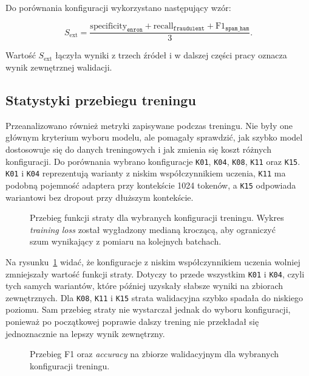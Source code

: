 Do porównania konfiguracji wykorzystano następujący wzór:

\[
S_{\mathrm{ext}} =
\frac{
\mathrm{specificity}_{\texttt{enron}} +
\mathrm{recall}_{\texttt{fraudulent}} +
\mathrm{F1}_{\texttt{spam\_ham}}
}{3}.
\]

Wartość \(S_{\mathrm{ext}}\) łączyła wyniki z trzech źródeł i w dalszej części
pracy oznacza wynik zewnętrznej walidacji.

\subsection{Statystyki przebiegu treningu}

Przeanalizowano również metryki zapisywane podczas treningu. Nie były one
głównym kryterium wyboru modelu, ale pomagały sprawdzić, jak szybko model
dostosowuje się do danych treningowych i jak zmienia się koszt różnych
konfiguracji. Do porównania wybrano
konfiguracje \texttt{K01}, \texttt{K04}, \texttt{K08}, \texttt{K11} oraz
\texttt{K15}. \texttt{K01} i \texttt{K04} reprezentują warianty z niskim
współczynnikiem uczenia,
\texttt{K11} ma podobną pojemność adaptera przy kontekście 1024 tokenów, a
\texttt{K15} odpowiada wariantowi bez dropout przy dłuższym kontekście.

\begin{figure}[htbp]
\centering

\caption{Przebieg funkcji straty dla wybranych konfiguracji treningu. Wykres
\emph{training loss} został wygładzony medianą kroczącą, aby ograniczyć szum
wynikający z pomiaru na kolejnych batchach.}
\label{fig:checkpoint-training-loss-diagnostics}
\end{figure}

Na rysunku~\ref{fig:checkpoint-training-loss-diagnostics} widać, że konfiguracje
z niskim współczynnikiem uczenia wolniej zmniejszały wartość funkcji straty.
Dotyczy to przede wszystkim \texttt{K01} i \texttt{K04}, czyli tych samych
wariantów, które później uzyskały słabsze wyniki na zbiorach zewnętrznych. Dla
\texttt{K08}, \texttt{K11} i \texttt{K15} strata walidacyjna szybko spadała do
niskiego poziomu. Sam przebieg straty nie wystarczał jednak do wyboru
konfiguracji, ponieważ po początkowej poprawie dalszy trening nie przekładał się
jednoznacznie na lepszy wynik zewnętrzny.

\begin{figure}[htbp]
\centering

\caption{Przebieg F1 oraz \emph{accuracy} na zbiorze walidacyjnym dla wybranych
konfiguracji treningu.}
\label{fig:checkpoint-validation-metrics-diagnostics}
\end{figure}

